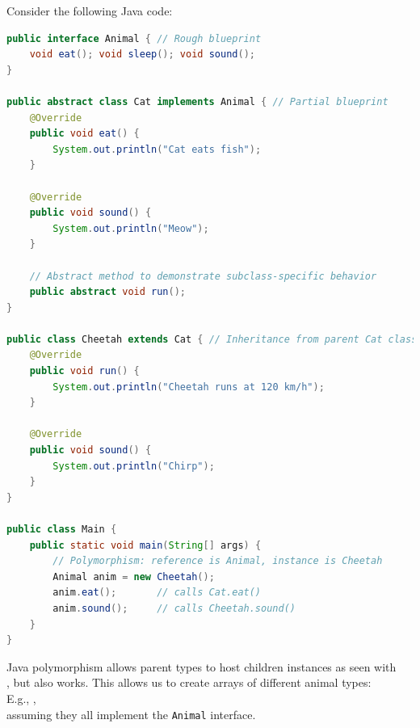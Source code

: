 \begin{Example}

    \label{ex:polymorphism_java}

\vspace{-.5em}
Consider the following Java code:
\begin{lstlisting}[language=Java, numbers=none]
public interface Animal { // Rough blueprint
    void eat(); void sleep(); void sound();
}

public abstract class Cat implements Animal { // Partial blueprint
    @Override
    public void eat() {
        System.out.println("Cat eats fish");
    }

    @Override
    public void sound() {
        System.out.println("Meow");
    }

    // Abstract method to demonstrate subclass-specific behavior
    public abstract void run();
}

public class Cheetah extends Cat { // Inheritance from parent Cat class
    @Override
    public void run() { 
        System.out.println("Cheetah runs at 120 km/h");
    }

    @Override
    public void sound() {
        System.out.println("Chirp");
    }
}

public class Main {
    public static void main(String[] args) {
        // Polymorphism: reference is Animal, instance is Cheetah
        Animal anim = new Cheetah();
        anim.eat();       // calls Cat.eat()
        anim.sound();     // calls Cheetah.sound()
    }
}
\end{lstlisting}
Java polymorphism allows parent types to host children instances as seen with\\ , 
but  also works. This allows us to create arrays of different animal types:\\
E.g.,
 ,\\
assuming they all implement the \texttt{Animal} interface.
\end{Example}

\newpage 

